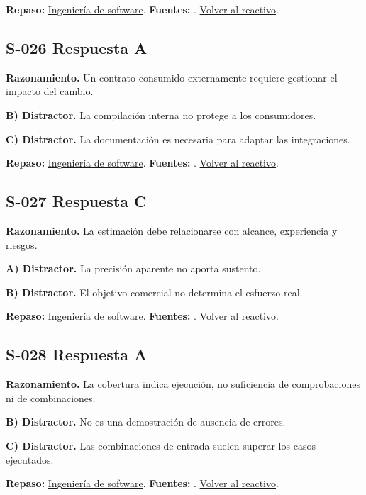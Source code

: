 \textbf{Repaso:} \hyperref[sec:s1]{Ingeniería de software}. \textbf{Fuentes:} \cite{scrum,swebok}. \hyperref[q:S-025]{Volver al reactivo}.\par\medskip

\subsection*{S-026 \quad Respuesta A}\label{s:S-026}
\textbf{Razonamiento.} Un contrato consumido externamente requiere gestionar el impacto del cambio.

\textbf{B) Distractor. }La compilación interna no protege a los consumidores.

\textbf{C) Distractor. }La documentación es necesaria para adaptar las integraciones.

\textbf{Repaso:} \hyperref[sec:s1]{Ingeniería de software}. \textbf{Fuentes:} \cite{scrum,swebok}. \hyperref[q:S-026]{Volver al reactivo}.\par\medskip

\subsection*{S-027 \quad Respuesta C}\label{s:S-027}
\textbf{Razonamiento.} La estimación debe relacionarse con alcance, experiencia y riesgos.

\textbf{A) Distractor. }La precisión aparente no aporta sustento.

\textbf{B) Distractor. }El objetivo comercial no determina el esfuerzo real.

\textbf{Repaso:} \hyperref[sec:s1]{Ingeniería de software}. \textbf{Fuentes:} \cite{scrum,swebok}. \hyperref[q:S-027]{Volver al reactivo}.\par\medskip

\subsection*{S-028 \quad Respuesta A}\label{s:S-028}
\textbf{Razonamiento.} La cobertura indica ejecución, no suficiencia de comprobaciones ni de combinaciones.

\textbf{B) Distractor. }No es una demostración de ausencia de errores.

\textbf{C) Distractor. }Las combinaciones de entrada suelen superar los casos ejecutados.

\textbf{Repaso:} \hyperref[sec:s1]{Ingeniería de software}. \textbf{Fuentes:} \cite{scrum,swebok}. \hyperref[q:S-028]{Volver al reactivo}.\par\medskip

